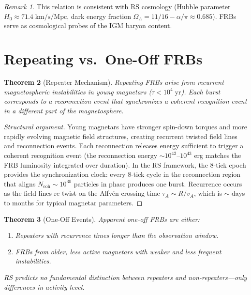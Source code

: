 \documentclass[12pt,a4paper]{article}
\newtheorem{theorem}{Theorem}[section]
\theoremstyle{definition}
\theoremstyle{remark}
\newtheorem{remark}[theorem]{Remark}
\begin{document}
\begin{remark}
This relation is consistent with RS cosmology (Hubble parameter
$H_0 \approx 71.4\;\mathrm{km/s/Mpc}$, dark energy fraction
$\Omega_\Lambda = 11/16 - \alpha/\pi \approx 0.685$).  FRBs serve
as cosmological probes of the IGM baryon content.
\end{remark}

\section{Repeating vs.\ One-Off FRBs}
\label{sec:repeaters}

\begin{theorem}[Repeater Mechanism]
Repeating FRBs arise from recurrent magnetospheric instabilities
in young magnetars ($\tau < 10^4\;\mathrm{yr}$).  Each burst
corresponds to a reconnection event that synchronizes a coherent
recognition event in a different part of the magnetosphere.
\end{theorem}

\begin{proof}[Structural argument]
Young magnetars have stronger spin-down torques and more rapidly
evolving magnetic field structures, creating recurrent twisted field
lines and reconnection events.  Each reconnection releases energy
sufficient to trigger a coherent recognition event (the reconnection
energy $\sim 10^{42}$--$10^{43}$ erg matches the FRB luminosity
integrated over duration).  In the RS framework, the 8-tick epoch
provides the synchronization clock: every 8-tick cycle in the
reconnection region that aligns $N_{\mathrm{coh}} \sim 10^{30}$
particles in phase produces one burst.  Recurrence occurs as the
field lines re-twist on the Alfvén crossing time $\tau_A \sim R/v_A$,
which is ${\sim}$ days to months for typical magnetar parameters.
\end{proof}

\begin{theorem}[One-Off Events]
Apparent one-off FRBs are either:
\begin{enumerate}
  \item Repeaters with recurrence times longer than the observation
  window.
  \item FRBs from older, less active magnetars with weaker and less
  frequent instabilities.
\end{enumerate}
RS predicts no fundamental distinction between repeaters and
non-repeaters---only differences in activity level.
\end{theorem}
\end{document}

